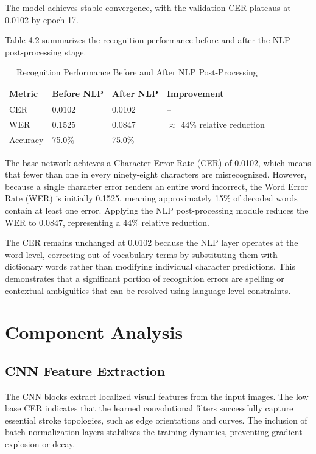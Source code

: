 The model achieves stable convergence, with the validation CER plateaus at 0.0102 by epoch 17. 

Table 4.2 summarizes the recognition performance before and after the NLP post-processing stage.

\begin{table}[h!]
\centering
\caption{Recognition Performance Before and After NLP Post-Processing}
\label{tab:perf_results}
\begin{tabular}{llll}
    \toprule
    \textbf{Metric} & \textbf{Before NLP} & \textbf{After NLP} & \textbf{Improvement} \\
    \midrule
    CER & 0.0102 & 0.0102 & -- \\
    WER & 0.1525 & 0.0847 & $\approx$ 44\% relative reduction \\
    Accuracy & 75.0\% & 75.0\% & -- \\
    \bottomrule
\end{tabular}
\end{table}

The base network achieves a Character Error Rate (CER) of 0.0102, which means that fewer than one in every ninety-eight characters are misrecognized. However, because a single character error renders an entire word incorrect, the Word Error Rate (WER) is initially 0.1525, meaning approximately 15\% of decoded words contain at least one error. Applying the NLP post-processing module reduces the WER to 0.0847, representing a 44\% relative reduction. 

The CER remains unchanged at 0.0102 because the NLP layer operates at the word level, correcting out-of-vocabulary terms by substituting them with dictionary words rather than modifying individual character predictions. This demonstrates that a significant portion of recognition errors are spelling or contextual ambiguities that can be resolved using language-level constraints.

\section{Component Analysis}
\subsection{CNN Feature Extraction}
The CNN blocks extract localized visual features from the input images. The low base CER indicates that the learned convolutional filters successfully capture essential stroke topologies, such as edge orientations and curves. The inclusion of batch normalization layers stabilizes the training dynamics, preventing gradient explosion or decay.

